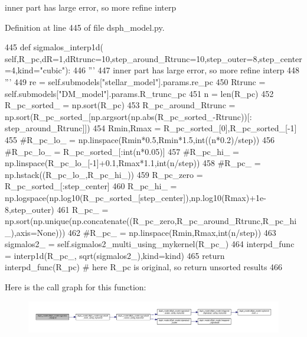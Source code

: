 \begin{DoxyVerb}inner part has large error, so more refine interp
\end{DoxyVerb}
 

Definition at line 445 of file dsph\+\_\+model.\+py.


\begin{DoxyCode}
445     \textcolor{keyword}{def }sigmalos\_interp1d(
      self,R\_pc,dR=1,dRtrunc=10,step\_around\_Rtrunc=10,step\_outer=8,step\_center=4,kind="cubic"):
446         \textcolor{stringliteral}{'''}
447 \textcolor{stringliteral}{        inner part has large error, so more refine interp}
448 \textcolor{stringliteral}{        '''}
449         re = self.submodels[\textcolor{stringliteral}{"stellar\_model"}].params.re\_pc
450         Rtrunc = self.submodels[\textcolor{stringliteral}{"DM\_model"}].params.R\_trunc\_pc
451         n = len(R\_pc)
452         R\_pc\_sorted\_ = np.sort(R\_pc)
453         R\_pc\_around\_Rtrunc = np.sort(R\_pc\_sorted\_[np.argsort(np.abs(R\_pc\_sorted\_-Rtrunc))[:
      step\_around\_Rtrunc]])
454         Rmin,Rmax = R\_pc\_sorted\_[0],R\_pc\_sorted\_[-1]
455         \textcolor{comment}{#R\_pc\_lo\_ = np.linspace(Rmin*0.5,Rmin*1.5,int((n*0.2)/step))}
456         \textcolor{comment}{#R\_pc\_lo\_ = R\_pc\_sorted\_[:int(n*0.05)]}
457         \textcolor{comment}{#R\_pc\_hi\_ = np.linspace(R\_pc\_lo\_[-1]+0.1,Rmax*1.1,int(n/step))}
458         \textcolor{comment}{#R\_pc\_ = np.hstack((R\_pc\_lo\_,R\_pc\_hi\_))}
459         R\_pc\_zero = R\_pc\_sorted\_[:step\_center]
460         R\_pc\_hi\_ = np.logspace(np.log10(R\_pc\_sorted\_[step\_center]),np.log10(Rmax)+1e-8,step\_outer)
461         R\_pc\_ = np.sort(np.unique(np.concatenate((R\_pc\_zero,R\_pc\_around\_Rtrunc,R\_pc\_hi\_),axis=\textcolor{keywordtype}{None})))
462         \textcolor{comment}{#R\_pc\_ = np.linspace(Rmin,Rmax,int(n/step))}
463         sigmalos2\_ = self.sigmalos2\_multi\_using\_mykernel(R\_pc\_)
464         interpd\_func = interp1d(R\_pc\_, sqrt(sigmalos2\_),kind=kind)
465         \textcolor{keywordflow}{return} interpd\_func(R\_pc) \textcolor{comment}{# here R\_pc is original, so return unsorted results}
466     
\end{DoxyCode}
Here is the call graph for this function\+:
\nopagebreak
\begin{figure}[H]
\begin{center}
\leavevmode
\includegraphics[width=350pt]{d0/d25/classdsph__model_1_1dSph__model_ad105b90e1827d25804eb3d7a3ba96f28_cgraph}
\end{center}
\end{figure}
\mbox{\label{classdsph__model_1_1dSph__model_a239ec859750c30fe31b6c19e94cd2e33}} 
